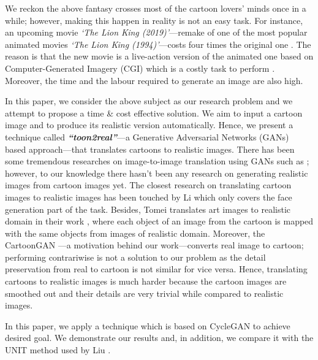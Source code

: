 \documentclass[10pt,twocolumn,letterpaper]{article}
\begin{document}
We reckon the above fantasy crosses most of the cartoon lovers' minds once in a while; however, making this happen in reality
is not
an easy task.
For instance,
an upcoming movie \textit{`The Lion King (2019)'}---remake of one of the most popular animated movies \textit{`The Lion King (1994)'}---costs four times
the
original one \cite{aramide-tinubu2018Nov, Bacon2019Feb}. The reason
is that the new movie is a live-action version of the animated one based on Computer-Generated Imagery (CGI) which is a costly task to perform \cite{BibEntry2015Jun}. Moreover, the time and the labour required to generate an image are also high.

In this paper, we consider the above subject as our research problem and we attempt to
propose 
a
time \& cost effective
solution. We aim to input a cartoon image and to produce its realistic version automatically. Hence, we present a technique called \textbf{\textit{``toon2real''}}---a Generative Adversarial Networks (GANs)~\cite{goodfellow2014generative} based approach---that translates cartoons to realistic images.
There has been some tremendous researches on image-to-image translation using GANs such as \cite{yu2018singlegan, CycleGAN2017, liu2017unsupervised, isola2017image, karras2018style}; however, to our knowledge there hasn't been any research on generating realistic images from cartoon images yet. The closest research on translating cartoon images to realistic images has been touched by Li \etal \cite{li2018twin} which only covers the face generation part of the task. Besides, Tomei \etal translates art images to realistic domain in their work \cite{tomei2018art2real}, where each object of an image from the cartoon is mapped with the same objects from images of realistic domain.
Moreover, the CartoonGAN \cite{chen2018cartoongan}---a motivation behind our work---converts real image to cartoon; performing contrariwise is not a solution to our problem as the detail preservation from real to cartoon is not similar for vice versa.
Hence, translating cartoons to realistic images is much harder because the cartoon images are smoothed out and their details are very trivial while compared to realistic images.

In this paper, we apply a technique which is based on CycleGAN \cite{CycleGAN2017} to achieve desired goal. We demonstrate our results and, in addition, we compare it with the UNIT method used by Liu \etal \cite{liu2017unsupervised}.
\end{document}

